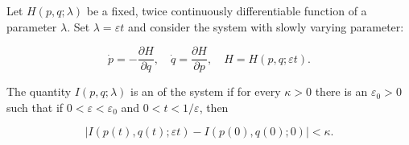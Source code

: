 Let $H(p, q; \lambda)$ be a fixed, twice continuously differentiable function of a parameter $\lambda$. Set $\lambda = \varepsilon t$ and consider the system with slowly varying parameter:

$$\dot{p} = -\frac{\partial H}{\partial q}, \quad \dot{q} = \frac{\partial H}{\partial p}, \quad H = H(p, q; \varepsilon t).$$

The quantity $I(p, q; \lambda)$ is an  of the system if for every $\kappa > 0$ there is an $\varepsilon_0 > 0$ such that if $0 < \varepsilon < \varepsilon_0$ and $0 < t < 1/\varepsilon$, then

$$|I(p(t), q(t); \varepsilon t) - I(p(0), q(0); 0)| < \kappa.$$
